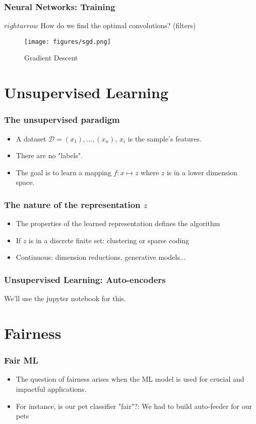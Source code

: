\documentclass[aspectratio=169]{beamer}
\begin{document}
\begin{frame}
	\frametitle{Neural Networks: Training}
	$rightarrow$ How do we find the optimal convolutions? (filters)
	\pause

	\begin{figure}
		\texttt{[image: figures/sgd.png]}
		\caption{Gradient Descent}\label{fig:}
	\end{figure}
\end{frame}

\section{Unsupervised Learning}
\begin{frame}
	\tableofcontents[currentsection]
\end{frame}

\begin{frame}
	\frametitle{The unsupervised paradigm}
	\begin{itemize}
		\item A dataset $\mathcal{D} = {(x_1), \ldots, (x_n)}$, $x_i$ is the
		      sample's features.
		\item There are no "labels".
		\item The goal is to learn a mapping $f: x\mapsto z$ where $z$ is in a
		      lower dimension space.
	\end{itemize}
\end{frame}

\begin{frame}
	\frametitle{The nature of the representation $z$}
	\begin{itemize}
		\item The properties of the learned representation defines the algorithm
		\item If $z$ is in a discrete finite set: clustering or sparse coding
		\item Continuous: dimension reductions, generative models...
	\end{itemize}
\end{frame}

\begin{frame}
	\frametitle{Unsupervised Learning: Auto-encoders}
	We'll use the jupyter notebook for this.
\end{frame}
\section{Fairness}

\begin{frame}
	\frametitle{Fair ML}
	\begin{itemize}
		\item The question of fairness arises when the ML model is used for crucial
		      and impactful applications.
		\item For instance, is our pet classifier "fair"?: We had to build
		      auto-feeder for our pets
	\end{itemize}
\end{frame}
\end{document}
